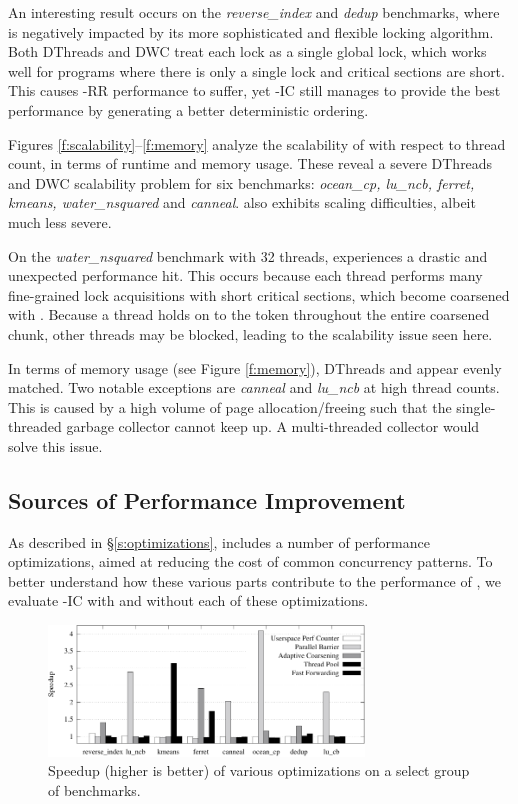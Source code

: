 An interesting result occurs on the {\it reverse\_index} and {\it dedup} benchmarks, where \lib{} is negatively impacted by its more sophisticated and flexible locking algorithm. Both DThreads and DWC treat each lock as a single global lock, which works well for programs where there is only a single lock and critical sections are short. This causes \lib{}-RR performance to suffer, yet \lib{}-IC still manages to provide the best performance by generating a better deterministic ordering.

Figures \ref{f:scalability}--\ref{f:memory} analyze the scalability of \lib{} with respect to thread count, in terms of runtime and memory usage. These reveal a severe DThreads and DWC scalability problem for six benchmarks: {\it  ocean\_cp, lu\_ncb, ferret, kmeans, water\_nsquared} and {\it canneal}. \lib{} also exhibits scaling difficulties, albeit much less severe. 

On the {\it water\_nsquared} benchmark with 32 threads, \lib{} experiences a drastic and unexpected performance hit. This occurs because each thread performs many fine-grained lock acquisitions with short critical sections, which become coarsened with \lib{}. Because a thread holds on to the token throughout the entire coarsened chunk, other threads may be blocked, leading to the scalability issue seen here.

In terms of memory usage (see Figure \ref{f:memory}), DThreads and \lib{} appear evenly matched. Two notable exceptions are {\it canneal} and {\it lu\_ncb} at high thread counts. This is caused by a high volume of page allocation/freeing such that the single-threaded \conversion{} garbage collector cannot keep up. A multi-threaded collector would solve this issue.

\subsection{Sources of Performance Improvement}

As described in \S\ref{s:optimizations}, \lib{} includes a number of performance optimizations, aimed at reducing the cost of common concurrency patterns. To better understand how these various parts contribute to the performance of \lib{}, we evaluate \lib{}-IC with and without each of these optimizations.

\begin{figure}
\centering
\includegraphics[width=3.3in]{figures/optimizations.pdf}
\caption{Speedup (higher is better) of various optimizations on a select group of benchmarks.}
\label{f:optimizations}
\end{figure}

